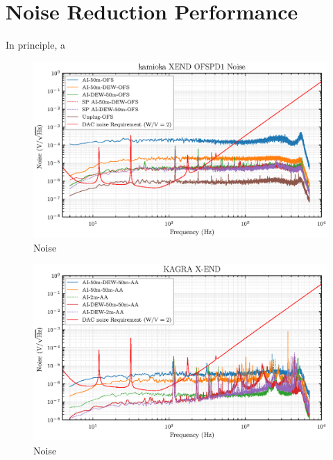 \section{Noise Reduction Performance}
In principle, a 

\begin{figure}[bt]
\centering
\includegraphics[width=1\textwidth]{figure/noise/DEWnoiseKamiokaSP}
\caption{Noise}\label{fig:noiseKSP}

\end{figure}
\begin{figure}[bt]
\centering
\includegraphics[width=1\textwidth]{figure/noise/DEWnoiseKamioka}
\caption{Noise}\label{fig:noiseK}
\end{figure}